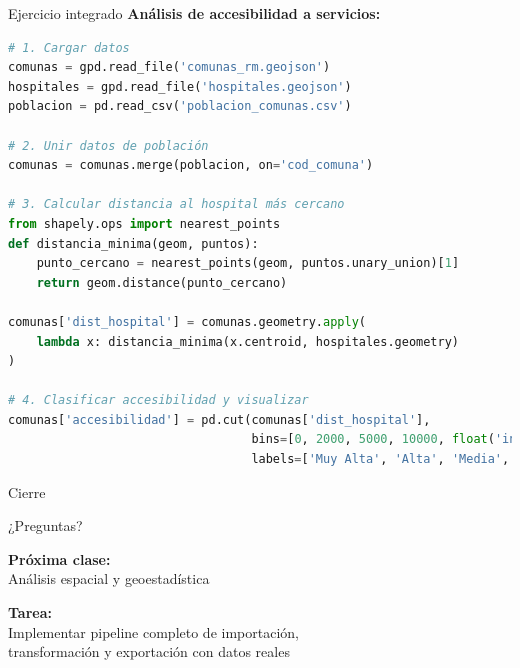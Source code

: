 \documentclass[10pt,aspectratio=169]{beamer}
\begin{document}
\begin{frame}[fragile]{Ejercicio integrado}
    \textbf{Análisis de accesibilidad a servicios:}
    \begin{lstlisting}[language=Python]
# 1. Cargar datos
comunas = gpd.read_file('comunas_rm.geojson')
hospitales = gpd.read_file('hospitales.geojson')
poblacion = pd.read_csv('poblacion_comunas.csv')

# 2. Unir datos de población
comunas = comunas.merge(poblacion, on='cod_comuna')

# 3. Calcular distancia al hospital más cercano
from shapely.ops import nearest_points
def distancia_minima(geom, puntos):
    punto_cercano = nearest_points(geom, puntos.unary_union)[1]
    return geom.distance(punto_cercano)

comunas['dist_hospital'] = comunas.geometry.apply(
    lambda x: distancia_minima(x.centroid, hospitales.geometry)
)

# 4. Clasificar accesibilidad y visualizar
comunas['accesibilidad'] = pd.cut(comunas['dist_hospital'], 
                                  bins=[0, 2000, 5000, 10000, float('inf')],
                                  labels=['Muy Alta', 'Alta', 'Media', 'Baja'])
    \end{lstlisting}
\end{frame}

\begin{frame}{Cierre}
    \begin{center}
        \Large{¿Preguntas?}
        
        \vspace{1cm}
        
        \textbf{Próxima clase:} \\
        Análisis espacial y geoestadística
        
        \vspace{1cm}
        
        \textbf{Tarea:} \\
        Implementar pipeline completo de importación, \\
        transformación y exportación con datos reales
    \end{center}
\end{frame}
\end{document}
